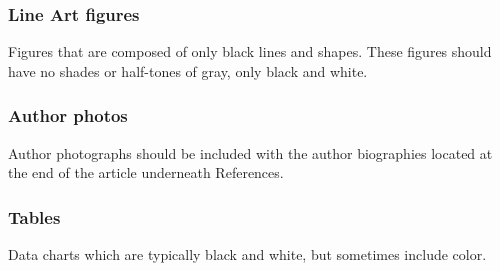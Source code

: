 \documentclass{ieeeaccess}
\begin{document}
\subsubsection{Line Art figures}
{Figures that are composed of only black lines and shapes. These figures
should have no shades or half-tones of gray, only black and white.}

\subsubsection{Author photos}
{Author photographs should be included with the author biographies located at the end of the article underneath References. }

\subsubsection{Tables}
{Data charts which are typically black and white, but sometimes include
color.}
\end{document}
